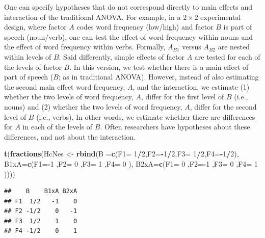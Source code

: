 \documentclass[12pt,]{krantz}
\newenvironment{Shaded}{\begin{snugshade}}{\end{snugshade}}
\newcommand{\DataTypeTok}[1]{\textcolor[rgb]{0.13,0.29,0.53}{#1}}
\newcommand{\DecValTok}[1]{\textcolor[rgb]{0.00,0.00,0.81}{#1}}
\newcommand{\KeywordTok}[1]{\textcolor[rgb]{0.13,0.29,0.53}{\textbf{#1}}}
\newcommand{\NormalTok}[1]{#1}
\newcommand{\OperatorTok}[1]{\textcolor[rgb]{0.81,0.36,0.00}{\textbf{#1}}}
\newcommand{\StringTok}[1]{\textcolor[rgb]{0.31,0.60,0.02}{#1}}
\theoremstyle{definition}
\theoremstyle{definition}
\theoremstyle{definition}
\theoremstyle{remark}
\begin{document}
One can specify hypotheses that do not correspond directly to main effects and interaction of the traditional ANOVA. For example, in a \(2 \times 2\) experimental design, where factor \(A\) codes word frequency (low/high) and factor \(B\) is part of speech (noun/verb), one can test the effect of word frequency within nouns and the effect of word frequency within verbs. Formally, \(A_{B1}\) versus \(A_{B2}\) are nested within levels of \(B\). Said differently, simple effects of factor \(A\) are tested for each of the levels of factor \(B\).
In this version, we test whether there is a main effect of part of speech (\(B\); as in traditional ANOVA). However, instead of also estimating the second main effect word frequency, \(A\), and the interaction, we estimate (1) whether the two levels of word frequency, \(A\), differ for the first level of \(B\) (i.e., nouns) and (2) whether the two levels of word frequency, \(A\), differ for the second level of \(B\) (i.e., verbs). In other words, we estimate whether there are differences for \(A\) in each of the levels of \(B\). Often researchers have hypotheses about these differences, and not about the interaction.

\begin{Shaded}
\begin{Highlighting}[]
\KeywordTok{t}\NormalTok{(}\KeywordTok{fractions}\NormalTok{(HcNes <-}\StringTok{ }\KeywordTok{rbind}\NormalTok{(}\DataTypeTok{B   =}\KeywordTok{c}\NormalTok{(}\DataTypeTok{F1=} \DecValTok{1}\OperatorTok{/}\DecValTok{2}\NormalTok{,}\DataTypeTok{F2=}\OperatorTok{-}\DecValTok{1}\OperatorTok{/}\DecValTok{2}\NormalTok{,}\DataTypeTok{F3=} \DecValTok{1}\OperatorTok{/}\DecValTok{2}\NormalTok{,}\DataTypeTok{F4=}\OperatorTok{-}\DecValTok{1}\OperatorTok{/}\DecValTok{2}\NormalTok{),}
                           \DataTypeTok{B1xA=}\KeywordTok{c}\NormalTok{(}\DataTypeTok{F1=}\OperatorTok{-}\DecValTok{1}\NormalTok{  ,}\DataTypeTok{F2=} \DecValTok{0}\NormalTok{  ,}\DataTypeTok{F3=} \DecValTok{1}\NormalTok{  ,}\DataTypeTok{F4=} \DecValTok{0}\NormalTok{  ),}
                           \DataTypeTok{B2xA=}\KeywordTok{c}\NormalTok{(}\DataTypeTok{F1=} \DecValTok{0}\NormalTok{  ,}\DataTypeTok{F2=}\OperatorTok{-}\DecValTok{1}\NormalTok{  ,}\DataTypeTok{F3=} \DecValTok{0}\NormalTok{  ,}\DataTypeTok{F4=} \DecValTok{1}\NormalTok{ ))))}
\end{Highlighting}
\end{Shaded}

\begin{verbatim}
##    B    B1xA B2xA
## F1  1/2   -1    0
## F2 -1/2    0   -1
## F3  1/2    1    0
## F4 -1/2    0    1
\end{verbatim}
\end{document}
